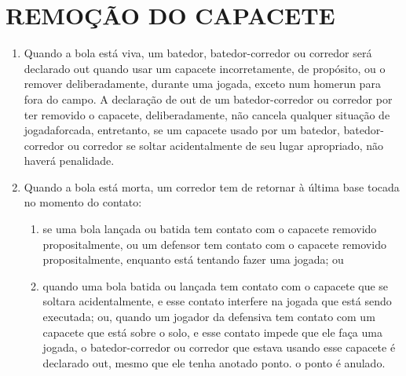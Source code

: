 \section{REMOÇÃO DO CAPACETE}
\begin{enumerate}[label=(\alph*)]
	\item   Quando a bola está viva, um batedor, batedor-corredor ou corredor será declarado \gls{out} quando usar um capacete incorretamente, de propósito, ou o remover deliberadamente, durante uma jogada, exceto num \gls{homerun} para fora do campo. A declaração de \gls{out} de um batedor-corredor ou corredor por ter removido o capacete, deliberadamente, não cancela qualquer situação de  \gls{jogadaforcada}, entretanto, se um capacete usado por um batedor, batedor-corredor ou corredor se soltar acidentalmente de seu lugar apropriado, não haverá penalidade.
	\item  Quando a bola está morta, um corredor tem de retornar à última base tocada no momento do contato:

	\begin{enumerate}[label=\roman*.]
		\item  se uma bola lançada ou batida tem contato com o capacete removido propositalmente, ou um defensor tem contato com o capacete removido propositalmente, enquanto está tentando fazer uma jogada; ou

		\item quando uma bola batida ou lançada tem contato com o capacete que  se soltara acidentalmente, e esse contato interfere na jogada que está sendo executada; ou, quando um jogador da defensiva tem contato com um capacete que está sobre o solo, e esse contato impede que ele faça  uma jogada, o batedor-corredor ou corredor que estava usando esse  capacete é declarado \gls{out}, mesmo que ele tenha anotado ponto. o ponto é anulado.
	\end{enumerate}
\end{enumerate}

